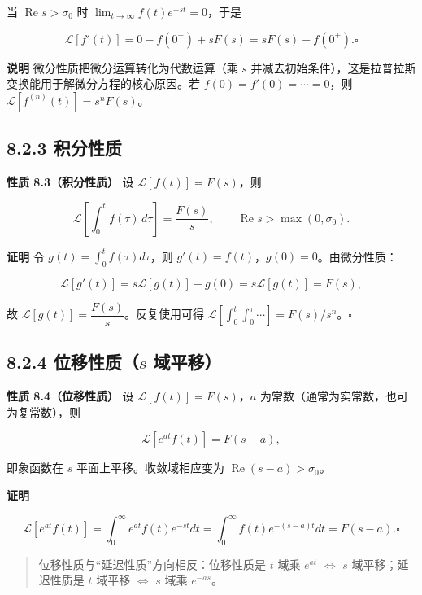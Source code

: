 当 \(\operatorname{Re}s>\sigma_0\) 时
\(\lim_{t\to\infty}f(t)e^{-st}=0\)，于是

\[
\mathcal{L}[f'(t)]=0-f(0^+)+sF(s)=sF(s)-f(0^+). \square
\]

\textbf{说明} 微分性质把微分运算转化为代数运算（乘 \(s\)
并减去初始条件），这是拉普拉斯变换能用于解微分方程的核心原因。若
\(f(0)=f'(0)=\cdots=0\)，则 \(\mathcal{L}[f^{(n)}(t)]=s^nF(s)\)。

\subsection{8.2.3 积分性质}\label{ux79efux5206ux6027ux8d28-1}

\textbf{性质 8.3（积分性质）} 设 \(\mathcal{L}[f(t)]=F(s)\)，则

\[
\mathcal{L}\left[\int_0^{t}f(\tau)\,d\tau\right] = \frac{F(s)}{s},\qquad \operatorname{Re}s>\max(0,\sigma_0).
\]

\textbf{证明} 令 \(g(t)=\int_0^t f(\tau)d\tau\)，则
\(g'(t)=f(t)\)，\(g(0)=0\)。由微分性质：

\[
\mathcal{L}[g'(t)]=s\mathcal{L}[g(t)]-g(0)=s\mathcal{L}[g(t)]=F(s),
\]

故 \(\mathcal{L}[g(t)]=\dfrac{F(s)}{s}\)。反复使用可得
\(\mathcal{L}\left[\int_0^t\int_0^{\tau}\cdots\right]=F(s)/s^n\)。\(\square\)

\subsection{\texorpdfstring{8.2.4 位移性质（\(s\)
域平移）}{8.2.4 位移性质（s 域平移）}}\label{ux4f4dux79fbux6027ux8d28s-ux57dfux5e73ux79fb}

\textbf{性质 8.4（位移性质）} 设 \(\mathcal{L}[f(t)]=F(s)\)，\(a\)
为常数（通常为实常数，也可为复常数），则

\[
\mathcal{L}[e^{at}f(t)] = F(s-a),
\]

即象函数在 \(s\) 平面上平移。收敛域相应变为
\(\operatorname{Re}(s-a)>\sigma_0\)。

\textbf{证明}

\[
\mathcal{L}[e^{at}f(t)]=\int_0^{\infty}e^{at}f(t)e^{-st}dt
=\int_0^{\infty}f(t)e^{-(s-a)t}dt=F(s-a). \square
\]

\begin{quote}
位移性质与``延迟性质''方向相反：位移性质是 \(t\) 域乘 \(e^{at}\)
\(\Leftrightarrow\) \(s\) 域平移；延迟性质是 \(t\) 域平移
\(\Leftrightarrow\) \(s\) 域乘 \(e^{-as}\)。
\end{quote}

